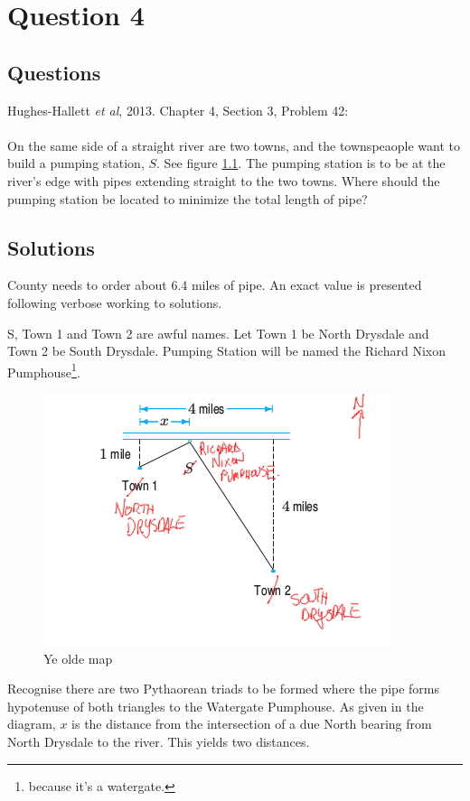 \chapter{Question 4}
\section{Questions}
Hughes-Hallett \emph{et al}, 2013. Chapter 4, Section 3, Problem 42: \\
\\
\noindent On the same side of a straight river are two towns, and the
townspeaople want to build a pumping station, $S$. See figure \ref{fig:q4_map}.
The pumping station is to be at the river's edge with pipes extending straight
to the two towns. Where should the pumping station be located to minimize the
total length of pipe?

\section{Solutions}
County needs to order about 6.4 miles of pipe. An exact value is presented
following verbose working to solutions.

\noindent S, Town 1 and Town 2 are awful names. Let Town 1 be North Drysdale
and Town 2 be South Drysdale. Pumping Station will be named the Richard Nixon
Pumphouse\footnote{because it's a watergate.}.
\newpage
\begin{figure}[!t]
  \includegraphics[width=\linewidth]{solutions/q4/map.png}
  \caption{Ye olde map}
  \label{fig:q4_map}
\end{figure}

\noindent Recognise there are two Pythaorean triads to be formed where the pipe
forms hypotenuse of both triangles to the Watergate Pumphouse. As given in the
diagram, $x$ is the distance from the intersection of a due North bearing from
North Drysdale to the river. This yields two distances.

